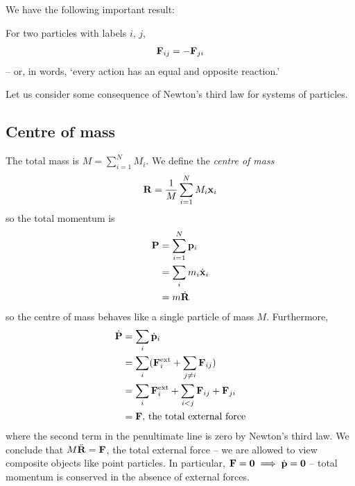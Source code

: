 \documentclass{../../template/note}
\begin{document}
    We have the following important result:
    \begin{theorem}
        For two particles with labels \(i\), \(j\),
        \begin{align*}
            \V F_{ij} = -\V F_{ji}
        \end{align*}
        -- or, in words, `every action has an equal and opposite reaction.'
    \end{theorem}

    
    Let us consider some consequence of Newton's third law for systems of particles.

    \subsection{Centre of mass}

    The total mass is \(M = \sum_{i=1}^N M_i\). We define the \emph{centre of mass}
    \begin{align*}
        \V R = \frac 1 M \sum_{i=1}^N M_i \V x_i
    \end{align*}
    so the total momentum is
    \begin{align*}
        \V P &= \sum_{i=1}^N \V p _i \\
        &= \sum_i m_i \dot{\V x}_i \\
        &= m \dot{\V R}
    \end{align*}
    so the centre of mass behaves like a single particle of mass \(M\). Furthermore,
    \begin{align*}
        \dot{\V P} &= \sum_i \dot{\V p}_i \\
        &= \sum_i (\V F_i^\text{ext} + \sum_{j \neq i}\V F_{ij}) \\
        &= \sum_i \V F_i^\text{ext} + \sum_{i < j}\V F_{ij} + \V F_{ji} \\
        &= \V F,\, \text{the total external force}
    \end{align*}
    where the second term in the penultimate line is zero by Newton's third law. We conclude that \(M \ddot{\V R} = \V F\), the total external force -- we are allowed to view composite objects like point particles. In particular, \(\V F = \V 0 \implies \dot{\V p} = \V 0\) -- total momentum is conserved in the absence of external forces.
\end{document}
